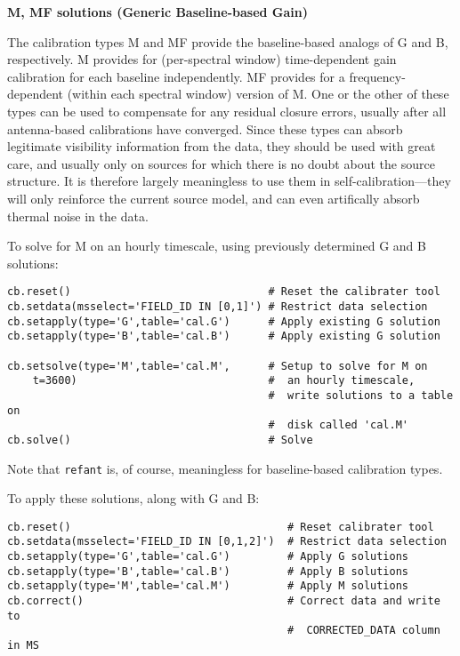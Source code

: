 \vspace{3mm}
\noindent
{\bf M, MF solutions (Generic Baseline-based Gain)}

The calibration types M and MF provide the baseline-based analogs
of G and B, respectively.  M provides for (per-spectral window)
time-dependent gain calibration for each baseline independently.  MF
provides for a frequency-dependent (within each spectral window)
version of M.  One or the other of these types can be used to
compensate for any residual closure errors, usually after all
antenna-based calibrations have converged.  Since these types can
absorb legitimate visibility information from the data, they should be
used with great care, and usually only on sources for which there is
no doubt about the source structure.  It is therefore largely
meaningless to use them in self-calibration---they will only reinforce
the current source model, and can even artifically absorb thermal
noise in the data.

To solve for M on an hourly timescale, using previously determined
G and B solutions:

\small
\begin{verbatim}
cb.reset()                               # Reset the calibrater tool
cb.setdata(msselect='FIELD_ID IN [0,1]') # Restrict data selection
cb.setapply(type='G',table='cal.G')      # Apply existing G solution
cb.setapply(type='B',table='cal.B')      # Apply existing G solution

cb.setsolve(type='M',table='cal.M',      # Setup to solve for M on
    t=3600)                              #  an hourly timescale,
                                         #  write solutions to a table on
                                         #  disk called 'cal.M'
cb.solve()                               # Solve
\end{verbatim}
\normalsize

Note that {\tt refant} is, of course, meaningless for baseline-based
calibration types.

To apply these solutions, along with G and B:

\small
\begin{verbatim}
cb.reset()                                  # Reset calibrater tool
cb.setdata(msselect='FIELD_ID IN [0,1,2]')  # Restrict data selection
cb.setapply(type='G',table='cal.G')         # Apply G solutions
cb.setapply(type='B',table='cal.B')         # Apply B solutions
cb.setapply(type='M',table='cal.M')         # Apply M solutions
cb.correct()                                # Correct data and write to
                                            #  CORRECTED_DATA column in MS
\end{verbatim}
\normalsize



